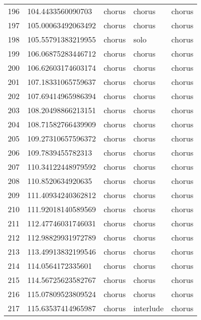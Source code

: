 \begin{table}[]
\begin{tabular}{lllll}
    196  & 104.4433560090703  & chorus       & chorus          & chorus         \\
    197  & 105.00063492063492 & chorus       & chorus          & chorus         \\
    198  & 105.55791383219955 & chorus       & solo            & chorus         \\
    199  & 106.06875283446712 & chorus       & chorus          & chorus         \\
    200  & 106.62603174603174 & chorus       & chorus          & chorus         \\
    201  & 107.18331065759637 & chorus       & chorus          & chorus         \\
    202  & 107.69414965986394 & chorus       & chorus          & chorus         \\
    203  & 108.20498866213151 & chorus       & chorus          & chorus         \\
    204  & 108.71582766439909 & chorus       & chorus          & chorus         \\
    205  & 109.27310657596372 & chorus       & chorus          & chorus         \\
    206  & 109.7839455782313  & chorus       & chorus          & chorus         \\
    207  & 110.34122448979592 & chorus       & chorus          & chorus         \\
    208  & 110.8520634920635  & chorus       & chorus          & chorus         \\
    209  & 111.40934240362812 & chorus       & chorus          & chorus         \\
    210  & 111.92018140589569 & chorus       & chorus          & chorus         \\
    211  & 112.47746031746031 & chorus       & chorus          & chorus         \\
    212  & 112.98829931972789 & chorus       & chorus          & chorus         \\
    213  & 113.49913832199546 & chorus       & chorus          & chorus         \\
    214  & 114.0564172335601  & chorus       & chorus          & chorus         \\
    215  & 114.56725623582767 & chorus       & chorus          & chorus         \\
    216  & 115.07809523809524 & chorus       & chorus          & chorus         \\
    217  & 115.63537414965987 & chorus       & interlude       & chorus         \\

\end{tabular}
\end{table}
